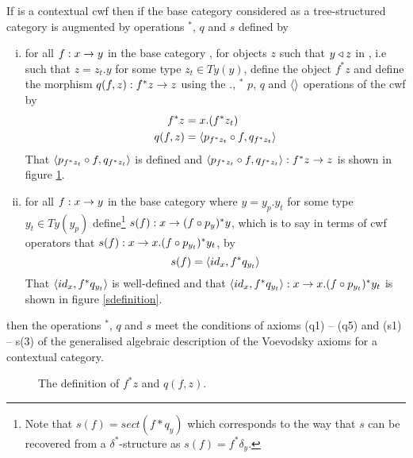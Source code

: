 \begin{lemmastar}
If \catcw is a contextual cwf then if the base category considered as a tree-structured category is augmented  by operations $^*$, $q$ and $s$ defined by
\begin{enumerate} [(i)]
\item for all $f: x \rightarrow y$ in the base category \catcw, for objects $z$ such that $y \triangleleft z$ in \catcw, i.e such that
$z=z_t.y$ for some type $z_t \in Ty(y)$, define the object $f^*z$ 
and define the  morphism $q(f,z):f^*z \rightarrow z$  using the $.$, $^*$ $p$, $q$ and $\langle\rangle$ operations of the cwf \catcw   by
\begin{align}
f^*z    & = x.(f^*z_t) \\
q(f,z) & =\langle p_{f^*z_t} \circ f,q_{f^*z_t}\rangle
\end{align}
That $\langle p_{f^*z_t} \circ f,q_{f^*z_t}\rangle$ is defined 
and $\langle p_{f^*z_t} \circ f,q_{f^*z_t}\rangle: f^*z \rightarrow z$ is shown in figure \ref{qdefinition}.
\item 
for all $f : x \rightarrow y$ in the base category \catcw where $y=y_p.y_t$ for some type $y_t \in Ty(y_p)$ 
define\footnote{Note that $s(f) = sect(f*q_y)$ which corresponds to the way that 
$s$ can be recovered from a $\delta^*$-structure as $s(f)=f^*\delta_y$.} $s(f):x \rightarrow (f\circ p_y)^*y$,
which is to say in terms of cwf operators that $s(f):x \rightarrow x.(f \circ p_{y_t})^*y_t$, by
\begin{equation}
s(f) = \langle id_x,f^*q_{y_t}\rangle
\end{equation}
That  $\langle id_x,f^*q_{y_t}\rangle$ is well-defined and that $\langle id_x,f^*q_{y_t}\rangle:x \rightarrow x.(f \circ p_{y_t})^*y_t$
is shown in figure \ref{sdefinition}.
\end{enumerate}
then  the operations $^*$, $q$ and $s$ 
meet the conditions of axioms (q1) -- (q5) and (s1) -- s(3) of the \cite{Cartmell2018A}
generalised algebraic description of  the Voevodsky  axioms for a contextual category.
\begin{figure} [H]
\caption{The definition of $f^*z$ and $q(f,z)$.}
\label{qdefinition}
\vspace{0.5cm}
\end{figure}
\end{lemmastar}
